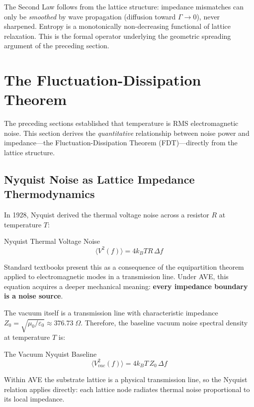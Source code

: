 \noindent The Second Law follows from the lattice structure: impedance mismatches can only be \textit{smoothed} by wave propagation (diffusion toward $\Gamma \to 0$), never sharpened. Entropy is a monotonically non-decreasing functional of lattice relaxation. This is the formal operator underlying the geometric spreading argument of the preceding section.

\section{The Fluctuation-Dissipation Theorem}
\label{sec:fluctuation_dissipation}

The preceding sections established that temperature is RMS electromagnetic noise. This section derives the \textit{quantitative} relationship between noise power and impedance---the Fluctuation-Dissipation Theorem (FDT)---directly from the lattice structure.

\subsection{Nyquist Noise as Lattice Impedance Thermodynamics}

In 1928, Nyquist derived the thermal voltage noise across a resistor $R$ at temperature $T$:
\begin{resultbox}{Nyquist Thermal Voltage Noise}
\begin{equation}
    \langle V^2(f) \rangle = 4 k_B T R \, \Delta f
    \label{eq:nyquist}
\end{equation}
\end{resultbox}
Standard textbooks present this as a consequence of the equipartition theorem applied to electromagnetic modes in a transmission line. Under AVE, this equation acquires a deeper mechanical meaning: \textbf{every impedance boundary is a noise source}.

The vacuum itself is a transmission line with characteristic impedance $Z_0 = \sqrt{\mu_0 / \varepsilon_0} \approx 376.73 \;\Omega$. Therefore, the baseline vacuum noise spectral density at temperature $T$ is:
\begin{resultbox}{The Vacuum Nyquist Baseline}
\begin{equation}
    \langle V^2_{vac}(f) \rangle = 4 k_B T \, Z_0 \, \Delta f
    \label{eq:vacuum_nyquist}
\end{equation}
\end{resultbox}
Within AVE the substrate lattice is a physical transmission line, so the Nyquist relation applies directly: each lattice node radiates thermal noise proportional to its local impedance.

